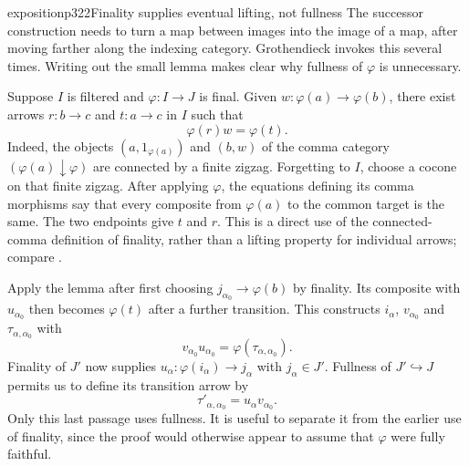\begin{dcomment}{exposition}{p322}{Finality supplies eventual lifting, not fullness}
The successor construction needs to turn a map between images into the image of a map, after moving farther along the indexing category. Grothendieck invokes this several times. Writing out the small lemma makes clear why fullness of $\varphi$ is unnecessary.

Suppose $I$ is filtered and $\varphi:I\to J$ is final. Given $w:\varphi(a)\to\varphi(b)$, there exist arrows $r:b\to c$ and $t:a\to c$ in $I$ such that
\[
                  \varphi(r)w=\varphi(t).
\]
Indeed, the objects $(a,1_{\varphi(a)})$ and $(b,w)$ of the comma category $(\varphi(a)\downarrow\varphi)$ are connected by a finite zigzag. Forgetting to $I$, choose a cocone on that finite zigzag. After applying $\varphi$, the equations defining its comma morphisms say that every composite from $\varphi(a)$ to the common target is the same. The two endpoints give $t$ and $r$. This is a direct use of the connected-comma definition of finality, rather than a lifting property for individual arrows; compare \citet[Definition 4.17.1]{StacksCofinal}.

Apply the lemma after first choosing $j_{\alpha_0}\to\varphi(b)$ by finality. Its composite with $u_{\alpha_0}$ then becomes $\varphi(t)$ after a further transition. This constructs $i_\alpha$, $v_{\alpha_0}$ and $\tau_{\alpha,\alpha_0}$ with
\[
v_{\alpha_0}u_{\alpha_0}=\varphi(\tau_{\alpha,\alpha_0}).
\]
Finality of $J'$ now supplies $u_\alpha:\varphi(i_\alpha)\to j_\alpha$ with $j_\alpha\in J'$. Fullness of $J'\hookrightarrow J$ permits us to define its transition arrow by
\[
\tau'_{\alpha,\alpha_0}=u_\alpha v_{\alpha_0}.
\]
Only this last passage uses fullness. It is useful to separate it from the earlier use of finality, since the proof would otherwise appear to assume that $\varphi$ were fully faithful.
\end{dcomment}



